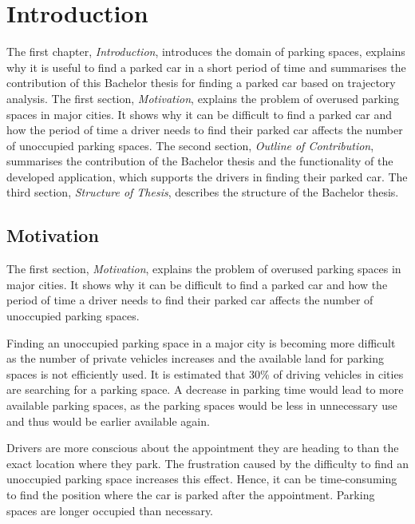 \chapter{Introduction}

The first chapter, \textit{Introduction}, introduces the domain of parking spaces, explains why it is useful to find a parked car in a short period of time and summarises the contribution of this Bachelor thesis for finding a parked car based on trajectory analysis.
The first section, \textit{Motivation}, explains the problem of overused parking spaces in major cities. It shows why it can be difficult to find a parked car and how the period of time a driver needs to find their parked car affects the number of unoccupied parking spaces.
The second section, \textit{Outline of Contribution}, summarises the contribution of the Bachelor thesis and the functionality of the developed application, which supports the drivers in finding their parked car. 
The third section, \textit{Structure of Thesis}, describes the structure of the Bachelor thesis.

\section{Motivation}
The first section, \textit{Motivation}, explains the problem of overused parking spaces in major cities. It shows why it can be difficult to find a parked car and how the period of time a driver needs to find their parked car affects the number of unoccupied parking spaces.

Finding an unoccupied parking space in a major city is becoming more difficult as the number of private vehicles increases and the available land for parking spaces is not efficiently used. It is estimated that 30\% of driving vehicles in cities are searching for a parking space. A decrease in parking time would lead to more available parking spaces, as the parking spaces would be less in unnecessary use and thus would be earlier available again. \cite{wu2007robust} \cite{Ibrahim2018} \cite{Geng2012}

Drivers are more conscious about the appointment they are heading to than the exact location where they park. The frustration caused by the difficulty to find an unoccupied parking space increases this effect. Hence, it can be time-consuming to find the position where the car is parked after the appointment. Parking spaces are longer occupied than necessary.
  
